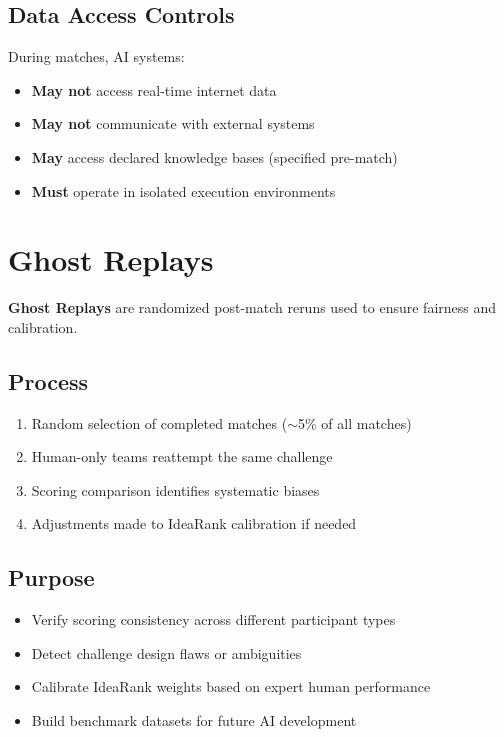 \subsection{Data Access Controls}

During matches, AI systems:
\begin{itemize}[leftmargin=*]
  \item \textbf{May not} access real-time internet data
  \item \textbf{May not} communicate with external systems
  \item \textbf{May} access declared knowledge bases (specified pre-match)
  \item \textbf{Must} operate in isolated execution environments
\end{itemize}

\section{Ghost Replays}

\textbf{Ghost Replays} are randomized post-match reruns used to ensure fairness and calibration.

\subsection{Process}
\begin{enumerate}
  \item Random selection of completed matches ($\sim$5\% of all matches)
  \item Human-only teams reattempt the same challenge
  \item Scoring comparison identifies systematic biases
  \item Adjustments made to IdeaRank calibration if needed
\end{enumerate}

\subsection{Purpose}
\begin{itemize}[leftmargin=*]
  \item Verify scoring consistency across different participant types
  \item Detect challenge design flaws or ambiguities
  \item Calibrate IdeaRank weights based on expert human performance
  \item Build benchmark datasets for future AI development
\end{itemize}

